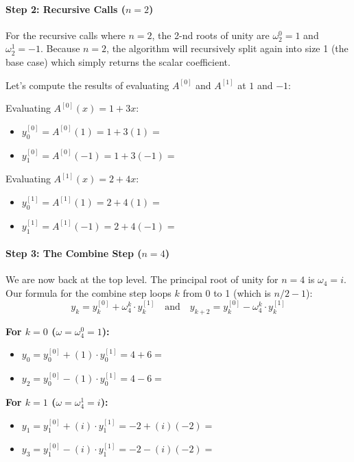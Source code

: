 \documentclass[11  pt]{article}
\begin{document}
\vs{0.5cm}

\paragraph{Step 2: Recursive Calls ($n=2$)}
For the recursive calls where $n=2$, the 2-nd roots of unity are $\omega_2^0 = 1$ and $\omega_2^1 = -1$.
Because $n=2$, the algorithm will recursively split again into size 1 (the base case) which simply returns the scalar coefficient. 

Let's compute the results of evaluating $A^{[0]}$ and $A^{[1]}$ at $1$ and $-1$:

Evaluating $A^{[0]}(x) = 1 + 3x$:
\begin{itemize}
    \item $y^{[0]}_0 = A^{[0]}(1) = 1 + 3(1) = $ 
    \item $y^{[0]}_1 = A^{[0]}(-1) = 1 + 3(-1) = $ 
\end{itemize}

Evaluating $A^{[1]}(x) = 2 + 4x$:
\begin{itemize}
    \item $y^{[1]}_0 = A^{[1]}(1) = 2 + 4(1) = $ 
    \item $y^{[1]}_1 = A^{[1]}(-1) = 2 + 4(-1) = $ 
\end{itemize}

\vs{0.5cm}

\paragraph{Step 3: The Combine Step ($n=4$)}
We are now back at the top level. The principal root of unity for $n=4$ is $\omega_4 = i$. 
Our formula for the combine step loops $k$ from 0 to 1 (which is $n/2 - 1$):
\begin{equation*}
    y_k = y^{[0]}_k + \omega_4^k \cdot y^{[1]}_k \quad \text{and} \quad y_{k+2} = y^{[0]}_k - \omega_4^k \cdot y^{[1]}_k
\end{equation*}

\textbf{For $k = 0$ ($\omega = \omega_4^0 = 1$):}
\begin{itemize}
    \item $y_0 = y^{[0]}_0 + (1) \cdot y^{[1]}_0 = 4 + 6 = $ 
    \item $y_2 = y^{[0]}_0 - (1) \cdot y^{[1]}_0 = 4 - 6 = $ 
\end{itemize}

\textbf{For $k = 1$ ($\omega = \omega_4^1 = i$):}
\begin{itemize}
    \item $y_1 = y^{[0]}_1 + (i) \cdot y^{[1]}_1 = -2 + (i)(-2) = $ 
    \item $y_3 = y^{[0]}_1 - (i) \cdot y^{[1]}_1 = -2 - (i)(-2) = $ 
\end{itemize}
\end{document}
